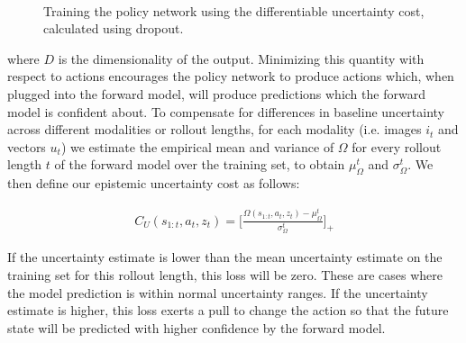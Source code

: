 \documentclass{article} %
\begin{document}

\begin{figure}[t!]
    \centering
     \\
    \label{planning-methods}
    \caption{Training the policy network using the differentiable uncertainty cost, calculated using dropout.}
\end{figure}




where $D$ is the dimensionality of the output. Minimizing this quantity with respect to actions encourages the policy network to produce actions which, when plugged into the forward model, will produce predictions which the forward model is confident about.
    To compensate for differences in baseline uncertainty across different modalities or rollout lengths, for each modality (i.e. images $i_t$ and vectors $u_t$) we estimate the empirical mean and variance of $\Omega$ for every rollout length $t$ of the forward model over the training set, to obtain $\mu_{\Omega}^t$ and $\sigma_{\Omega}^t$. We then define our epistemic uncertainty cost as follows:

    \begin{align}
      C_U(s_{1:t}, a_t, z_t) = \Big [ \frac{\Omega(s_{1:t}, a_t, z_t) - \mu_\Omega^t}{\sigma_\Omega^t} \Big]_+
    \end{align}

    If the uncertainty estimate is lower than the mean uncertainty estimate on the training set for this rollout length, this loss will be zero.
    These are cases where the model prediction is within normal uncertainty ranges. If the uncertainty estimate is higher, this loss exerts a pull to change the action so that the future state will be predicted with higher confidence by the forward model.
\end{document}
